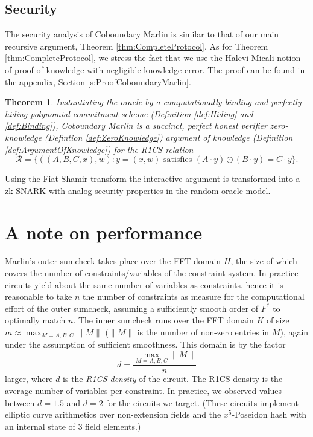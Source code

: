 \documentclass[10pt,article,oneside]{memoir}
\newtheorem{thm}{Theorem}[]
\theoremstyle{definition}
\theoremstyle{remark}
\begin{document}
\subsection{Security}

The security analysis of Coboundary Marlin is similar to that of our main recursive argument, Theorem \ref{thm:CompleteProtocol}.
As for Theorem \ref{thm:CompleteProtocol}, we stress the fact that we use the Halevi-Micali \cite{PoKHaleviMikali} notion of proof of knowledge with negligible knowledge error.
The proof can be found in the appendix, Section \ref{s:ProofCoboundaryMarlin}.
\begin{thm}
\label{thm:CoboundaryMarlin}
Instantiating the oracle by a computationally binding and perfectly hiding polynomial commitment scheme (Definition \ref{def:Hiding} and \ref{def:Binding}), Coboundary Marlin is a succinct, perfect honest verifier zero-knowledge (Defintion \ref{def:ZeroKnowledge}) argument of knowledge (Definition \ref{def:ArgumentOfKnowledge}) for the R1CS relation 
\[
\mathcal R =\big\{ ((A,B,C,x),w) : y=(x,w) \text{ satisfies } (A\cdot y)\odot(B\cdot y) = C\cdot y \big\}.
\]
\end{thm}

Using the Fiat-Shamir transform the interactive argument is transformed into a zk-SNARK with analog security properties   
in the random oracle model.

\section{A note on performance}
\label{s:NoteOnPerformance}
Marlin's outer sumcheck takes place over the FFT domain $H$, the size of which covers the number of constraints/variables of the  constraint system.
In practice circuits yield about the same number of variables as constraints, hence it is reasonable to take $n$ the number of constraints as measure for the computational effort of the outer sumcheck, assuming a sufficiently smooth order of $F^*$ to optimally match $n$.
The inner sumcheck runs over the FFT domain $K$ of size $m\approx \max_{M=A,B,C}\|M\|$ ($\|M\|$ is the number of non-zero entries in $M$), again under the assumption of sufficient smoothness.
This domain is by the factor
\[
d = \frac{\max_{M=A,B,C}\|M\|}{n}
\]
larger, where $d$ is the \textit{R1CS density} of the circuit. 
The R1CS density is the average number of variables per constraint.
In practice, we observed values between $d=1.5$ and $d=2$ for the circuits we target. 
(These circuits implement elliptic curve arithmetics over non-extension fields and the $x^5$-Poseidon hash \cite{Poseidon} with an internal state of $3$ field elements.)
\end{document}

